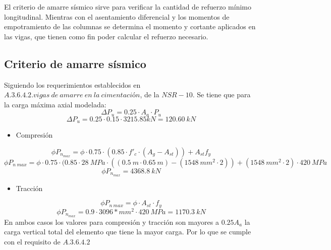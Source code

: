\documentclass[12pt]{article}
\begin{document}
El criterio de amarre sísmico sirve para verificar la cantidad de refuerzo mínimo longitudinal. Mientras con el asentamiento diferencial y los momentos de empotramiento de las columnas se determina el momento y cortante aplicados en las vigas, que tienen como fin poder calcular el refuerzo necesario.\\

\subsection{Criterio de amarre sísmico}
Siguiendo los requerimientos establecidos en $A.3.6.4.2. vigas~ de~ amarre~ en~ la~ cimentación$, de la $NSR-10$. Se tiene que para la carga máxima axial modelada:
\begin{equation*}
    \Delta P_{u}=0.25\cdot A_{a}\cdot P_{u}
\end{equation*}
\begin{equation*}
    \Delta P_{u}=0.25\cdot 0.15 \cdot 3215.85 kN=120.60~kN
\end{equation*}
\begin{itemize}
    \item Compresión
\end{itemize}
\begin{equation*}
    \phi P_{n_{max}}=\phi \cdot 0.75 \cdot(0.85\cdot f'_{c}\cdot(A_{g}-A_{st}))+A_{st}f_{y}
\end{equation*}
\begin{equation*}
    \phi P_{n~max}=\phi \cdot 0.75 \cdot(0.85\cdot 28~MPa\cdot((0.5~m\cdot 0.65~m)-(1548~mm^2\cdot 2))+(1548~mm^2\cdot 2)\cdot 420~MPa
\end{equation*}
\begin{equation*}
    \phi P_{n_{max}}=4368.8~kN
\end{equation*}
\begin{itemize}
    \item Tracción
\end{itemize}
\begin{equation*}
    \phi P_{n~max}=\phi\cdot A_{st}\cdot f_{y}
\end{equation*}
\begin{equation*}
    \phi P_{n_{max}}=0.9 \cdot 3096*mm^2 \cdot 420~MPa=1170.3~kN
\end{equation*}
En ambos casos los valores para compresión y tracción son mayores a $0.25A_{a}$ la carga vertical total del elemento que tiene la mayor carga. Por lo que se cumple con el requisito de $A.3.6.4.2$
\end{document}
